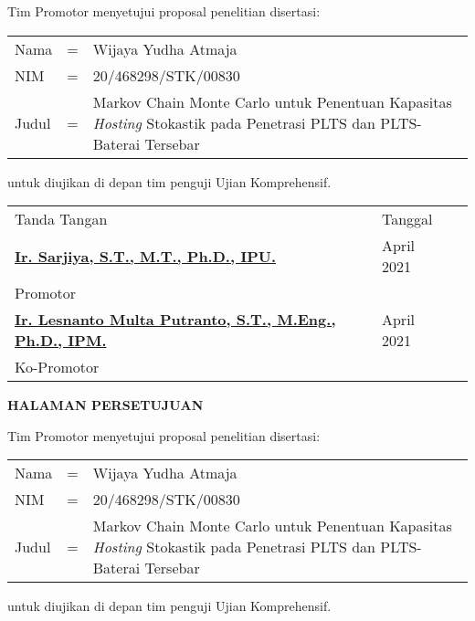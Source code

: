 \vspace*{8pt}
\noindent Tim Promotor menyetujui proposal penelitian disertasi:
\vspace*{-8pt}
{
\begin{longtable}{llp{288pt}}
	Nama						& = & Wijaya Yudha Atmaja\\
	NIM							& = & 20/468298/STK/00830\\
	Judul	& = & Markov Chain Monte Carlo untuk Penentuan Kapasitas \textit{Hosting} Stokastik pada Penetrasi PLTS dan PLTS-Baterai Tersebar
\end{longtable}
}
\vspace*{-22pt}
\noindent untuk diujikan di depan tim penguji Ujian Komprehensif.
\vspace*{5cm}

{
\begin{longtable}{lll}
	\vspace*{3cm}
	\hspace*{18pt}Tanda Tangan											& \hspace*{12pt}Tanggal\\
	\hspace*{-27pt}\underline{\textbf{Ir. Sarjiya, S.T., M.T., Ph.D., IPU.}}			& \; 5 April 2021\\
	\vspace*{3cm}
	\hspace*{-29pt}Promotor												&\\
	\hspace*{-27pt}\underline{\textbf{Ir. Lesnanto Multa Putranto, S.T., M.Eng., Ph.D., IPM.}}	& \; 5 April 2021\\
	\hspace*{-27pt}Ko-Promotor											&\\
\end{longtable}
}

\newpage
\centerline{\fontsize{14}{16}\textbf{HALAMAN PERSETUJUAN}}
\vspace*{27pt}
\noindent Tim Promotor menyetujui proposal penelitian disertasi:
\vspace*{-8pt}
{
\begin{longtable}{llp{288pt}}
	Nama						& = & Wijaya Yudha Atmaja\\
	NIM							& = & 20/468298/STK/00830\\
	Judul	& = & Markov Chain Monte Carlo untuk Penentuan Kapasitas \textit{Hosting} Stokastik pada Penetrasi PLTS dan PLTS-Baterai Tersebar
\end{longtable}
}
\vspace*{-22pt}
\noindent untuk diujikan di depan tim penguji Ujian Komprehensif.
\vspace*{5cm}

